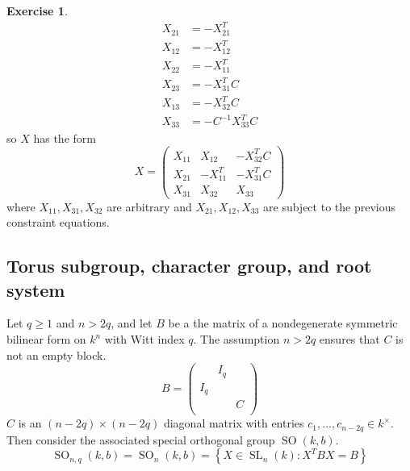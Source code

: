 \documentclass[12pt]{article}
\theoremstyle{definition}
\newtheorem{exercise}[theorem]{Exercise}
\numberwithin{theorem}{subsection}
\newcommand{\lb}{\left\{}
\newcommand{\rb}{\right\}}
\newcommand{\inv}{^{-1}}
\DeclareMathOperator{\SL}{SL}
\DeclareMathOperator{\SO}{SO}
\begin{document}
\begin{exercise}
\begin{align*}
	X_{21} &= - X_{21}^T \\
	X_{12} &= - X_{12}^T \\
	X_{22} &= - X_{11}^T \\
	X_{23} &= - X_{31}^T C \\
	X_{13} &= - X_{32}^T C \\
	X_{33} &= - C \inv X_{33}^T C
\end{align*}
so $X$ has the form
\[
	X =
	\begin{pmatrix}
		X_{11} & X_{12} & -X_{32}^T C \\
		X_{21} & -X_{11}^T & -X_{31}^T C \\
		X_{31} & X_{32} & X_{33}
	\end{pmatrix}
\]
where $X_{11}, X_{31}, X_{32}$ are arbitrary and $X_{21}, X_{12}, X_{33}$ are subject to the previous constraint equations.
\end{exercise}

\subsection{Torus subgroup, character group, and root system}

Let $q \ge 1$ and $n > 2q$, and let $B$ be a the matrix of a nondegenerate symmetric bilinear form on $k^n$ with Witt index $q$. The assumption $n > 2q$ ensures that $C$ is not an empty block.
\[
	B = 
	\begin{pmatrix}
		& I_q \\
		I_q \\
		&& C  \\
	\end{pmatrix}
\]
$C$ is an $(n-2q) \times (n-2q)$ diagonal matrix with entries $c_1, \ldots, c_{n-2q} \in k^\times$. Then consider the associated special orthogonal group $\SO(k,b)$.
\[
	\SO_{n,q}(k,b) = \SO_n(k,b) = \lb X \in \SL_n(k) : X^T BX = B \rb
\]
\end{document}
